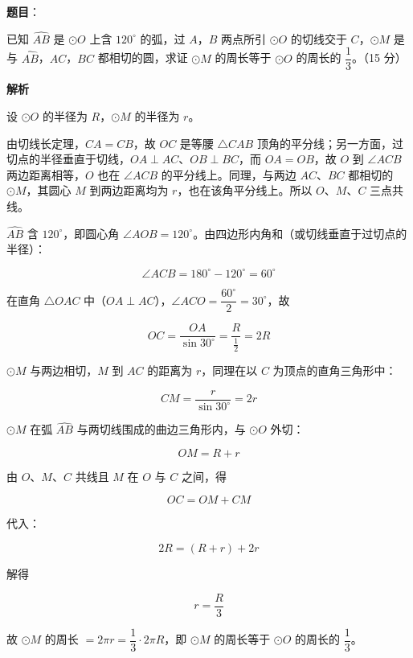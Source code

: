 \begin{answer}

\textbf{题目}：

已知 $\widehat{AB}$ 是 $\odot O$ 上含 $120^\circ$ 的弧，过 $A$，$B$ 两点所引 $\odot O$ 的切线交于 $C$，$\odot M$ 是与 $\widehat{AB}$，$AC$，$BC$ 都相切的圆，求证 $\odot M$ 的周长等于 $\odot O$ 的周长的 $\dfrac{1}{3}$。（15 分）
\nopagebreak[4]
\begin{center}\end{center}
\nopagebreak[4]
\textbf{解析}
\nopagebreak[4]
\begin{center}\end{center}
\nopagebreak[4]
设 $\odot O$ 的半径为 $R$，$\odot M$ 的半径为 $r$。

由切线长定理，$CA=CB$，故 $OC$ 是等腰 $\triangle CAB$ 顶角的平分线；另一方面，过切点的半径垂直于切线，$OA\perp AC$、$OB\perp BC$，而 $OA=OB$，故 $O$ 到 $\angle ACB$ 两边距离相等，$O$ 也在 $\angle ACB$ 的平分线上。同理，与两边 $AC$、$BC$ 都相切的 $\odot M$，其圆心 $M$ 到两边距离均为 $r$，也在该角平分线上。所以 $O$、$M$、$C$ 三点共线。

$\widehat{AB}$ 含 $120^\circ$，即圆心角 $\angle AOB=120^\circ$。由四边形内角和（或切线垂直于过切点的半径）：

\nopagebreak[4]
\[
\angle ACB=180^\circ-120^\circ=60^\circ
\]

在直角 $\triangle OAC$ 中（$OA\perp AC$），$\angle ACO=\dfrac{60^\circ}{2}=30^\circ$，故

\nopagebreak[4]
\[
OC=\frac{OA}{\sin 30^\circ}=\frac{R}{\frac{1}{2}}=2R
\]

$\odot M$ 与两边相切，$M$ 到 $AC$ 的距离为 $r$，同理在以 $C$ 为顶点的直角三角形中：

\nopagebreak[4]
\[
CM=\frac{r}{\sin 30^\circ}=2r
\]

$\odot M$ 在弧 $\widehat{AB}$ 与两切线围成的曲边三角形内，与 $\odot O$ 外切：

\nopagebreak[4]
\[
OM=R+r
\]

由 $O$、$M$、$C$ 共线且 $M$ 在 $O$ 与 $C$ 之间，得

\nopagebreak[4]
\[
OC=OM+CM
\]

代入：

\nopagebreak[4]
\[
2R=(R+r)+2r
\]

解得

\nopagebreak[4]
\[
r=\frac{R}{3}
\]

故 $\odot M$ 的周长 $=2\pi r=\dfrac{1}{3}\cdot 2\pi R$，即 $\odot M$ 的周长等于 $\odot O$ 的周长的 $\dfrac{1}{3}$。


\end{answer}